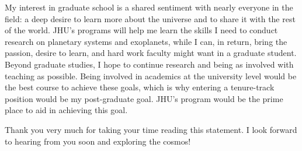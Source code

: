 \documentclass[11pt,letterpaper]{article}
\begin{document}
My interest in graduate school is a shared sentiment with nearly everyone in the field: a deep desire to learn more about the universe and to share it with the rest of the world. JHU’s programs will help me learn the skills I need to conduct research on planetary systems and exoplanets, while I can, in return, bring the passion, desire to learn, and hard work faculty might want in a graduate student. Beyond graduate studies, I hope to continue research and being as involved with teaching as possible. Being involved in academics at the university level would be the best course to achieve these goals, which is why entering a tenure-track position would be my post-graduate goal. JHU's program would be the prime place to aid in achieving this goal.

Thank you very much for taking your time reading this statement. I look forward to hearing from you soon and exploring the cosmos!
\end{document}

